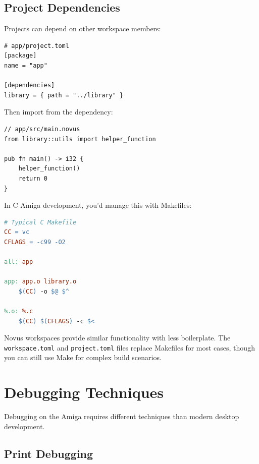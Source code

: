 \subsection{Project Dependencies}

Projects can depend on other workspace members:

\begin{lstlisting}
# app/project.toml
[package]
name = "app"

[dependencies]
library = { path = "../library" }
\end{lstlisting}

Then import from the dependency:

\begin{lstlisting}
// app/src/main.novus
from library::utils import helper_function

pub fn main() -> i32 {
    helper_function()
    return 0
}
\end{lstlisting}

\begin{comingfromc}
In C Amiga development, you'd manage this with Makefiles:

\begin{lstlisting}[language=make]
# Typical C Makefile
CC = vc
CFLAGS = -c99 -O2

all: app

app: app.o library.o
    $(CC) -o $@ $^

%.o: %.c
    $(CC) $(CFLAGS) -c $<
\end{lstlisting}

Novus workspaces provide similar functionality with less boilerplate. The \texttt{workspace.toml} and \texttt{project.toml} files replace Makefiles for most cases, though you can still use Make for complex build scenarios.
\end{comingfromc}

\section{Debugging Techniques}
\label{sec:debugging}

Debugging on the Amiga requires different techniques than modern desktop development.

\subsection{Print Debugging}

